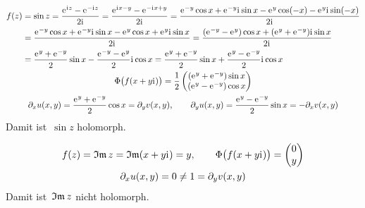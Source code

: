 \documentclass[../full]{subfiles}
\begin{document}

    \begin{gather*}
        \begin{aligned}
            f \paren{z} &
            = \sin z
            = \frac{\eEuler^{\iComplex z} - \eEuler^{-\iComplex z}}{2 \iComplex}
            = \frac
                {\eEuler^{\iComplex x - y} - \eEuler^{-\iComplex x + y}}
                {2 \iComplex}
            = \frac{
                    \eEuler^{-y} \cos x + \eEuler^{-y} \iComplex \sin x
                    - \eEuler^y \cos \paren{-x}
                        - \eEuler^y \iComplex \sin \paren{-x}
                }{2 \iComplex}
            \\ &
            = \frac{
                    \eEuler^{-y} \cos x + \eEuler^{-y} \iComplex \sin x
                    - \eEuler^y \cos x + \eEuler^y \iComplex \sin x
                }{2 \iComplex}
            = \frac{
                    \paren{\eEuler^{-y} - \eEuler^y} \cos x
                    + \paren{\eEuler^y + \eEuler^{-y}} \iComplex \sin x
                }{2 \iComplex}
            \\ &
            = \frac{\eEuler^y + \eEuler^{-y}}{2} \sin x
                - \frac{\eEuler^{-y} - \eEuler^y}{2} \iComplex \cos x
            = \frac{\eEuler^y + \eEuler^{-y}}{2} \sin x
                + \frac{\eEuler^y - \eEuler^{-y}}{2} \iComplex \cos x
        \end{aligned}
        \\
        \Phi \paren[\big]{f \paren{x + y \iComplex}}
        = \frac{1}{2} \begin{pmatrix}
            \paren{\eEuler^y + \eEuler^{-y}} \sin x \\
            \paren{\eEuler^y - \eEuler^{-y}} \cos x
        \end{pmatrix}
        \\
        \partial_x u \paren{x, y}
        = \frac{\eEuler^y + \eEuler^{-y}}{2} \cos x
        = \partial_y v \paren{x, y}
        , \qquad
        \partial_y u \paren{x, y}
        = \frac{\eEuler^y - \eEuler^{-y}}{2} \sin x
        = -\partial_x v \paren{x, y}
    \end{gather*}
    Damit ist~\( \sin z \) holomorph.



    \begin{gather*}
        f \paren{z} = \ImagPart z = \ImagPart \paren{x + y \iComplex} = y
        , \qquad
        \Phi \paren[\big]{f \paren{x + y \iComplex}}
        = \begin{pmatrix} 0 \\ y \end{pmatrix}
        \\
        \partial_x u \paren{x, y} = 0 \neq 1 = \partial_y v \paren{x, y}
    \end{gather*}
    Damit ist~\( \ImagPart z \) nicht holomorph.
\end{document}
